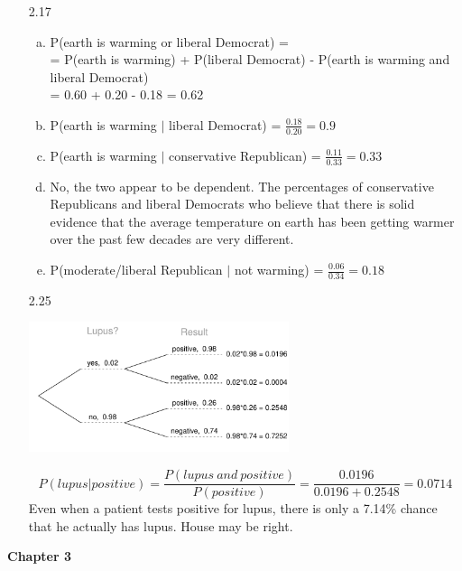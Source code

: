\documentclass[11pt]{article}
\newenvironment{parts}{
\vspace{-0.25cm}
\begin{enumerate}[(a)]
\setlength{\itemsep}{0mm}
}
{\end{enumerate}
}
\begin{document}
\begin{enumerate}
\item[2.17]
\begin{parts}
\item P(earth is warming or liberal Democrat) = \\
= P(earth is warming) + P(liberal Democrat)  - P(earth is warming and liberal Democrat) \\
= 0.60 + 0.20 - 0.18 = 0.62
\item P(earth is warming $|$ liberal Democrat) = $\frac{0.18}{0.20} = 0.9$
\item P(earth is warming $|$ conservative Republican) = $\frac{0.11}{0.33} = 0.33$
\item No, the two appear to be dependent. The percentages of conservative Republicans and liberal Democrats who believe that there is solid evidence that the average temperature on earth has been getting warmer over the past few decades are very different.
\item P(moderate/liberal Republican $|$ not warming) = $\frac{0.06}{0.34} = 0.18$
\end{parts}

\item[2.25] $\:$ \\
\begin{center}
\includegraphics[width=0.6\textwidth]{figures/02/tree_lupus}
\end{center}
\[ P(lupus | positive) = \frac{P(lupus~and~positive)}{P(positive)} = \frac{0.0196}{0.0196 + 0.2548} = 0.0714 \]
Even when a patient tests positive for lupus, there is only a 7.14\% chance that he actually has lupus. House may be right.

\end{enumerate}

%

\vspace{1cm}

{\Large \textcolor{custom_blue}{\textbf{Chapter 3}}}
\end{document}
